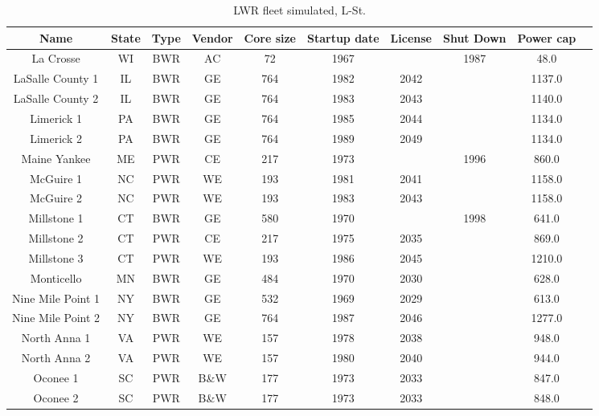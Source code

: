 \begin{table}[H]
    \centering
    \caption{LWR fleet simulated, L-St.}
    \label{tab:lwr_fleet2}
    \begin{tabular}{c c c c c c c c c c}
    \hline
    \textbf{Name} & \textbf{State} & \textbf{Type} & \textbf{Vendor} & \textbf{Core size} & \textbf{Startup date} & \textbf{License} & \textbf{Shut Down} & \textbf{Power cap} \\
    \hline
    La Crosse           & WI & BWR & AC   & 72  & 1967 &      & 1987 & 48.0  \\
    LaSalle County 1    & IL & BWR & GE   & 764 & 1982 & 2042 &      & 1137.0\\
    LaSalle County 2    & IL & BWR & GE   & 764 & 1983 & 2043 &      & 1140.0\\
    Limerick 1          & PA & BWR & GE   & 764 & 1985 & 2044 &      & 1134.0\\
    Limerick 2          & PA & BWR & GE   & 764 & 1989 & 2049 &      & 1134.0\\
    Maine Yankee        & ME & PWR & CE   & 217 & 1973 &      & 1996 & 860.0 \\
    McGuire 1           & NC & PWR & WE   & 193 & 1981 & 2041 &      & 1158.0\\
    McGuire 2           & NC & PWR & WE   & 193 & 1983 & 2043 &      & 1158.0\\
    Millstone 1         & CT & BWR & GE   & 580 & 1970 &      & 1998 & 641.0 \\
    Millstone 2         & CT & PWR & CE   & 217 & 1975 & 2035 &      & 869.0 \\
    Millstone 3         & CT & PWR & WE   & 193 & 1986 & 2045 &      & 1210.0\\
    Monticello          & MN & BWR & GE   & 484 & 1970 & 2030 &      & 628.0 \\
    Nine Mile Point 1   & NY & BWR & GE   & 532 & 1969 & 2029 &      & 613.0 \\
    Nine Mile Point 2   & NY & BWR & GE   & 764 & 1987 & 2046 &      & 1277.0\\
    North Anna 1        & VA & PWR & WE   & 157 & 1978 & 2038 &      & 948.0 \\
    North Anna 2        & VA & PWR & WE   & 157 & 1980 & 2040 &      & 944.0 \\
    Oconee 1            & SC & PWR & B\&W & 177 & 1973 & 2033 &      & 847.0 \\
    Oconee 2            & SC & PWR & B\&W & 177 & 1973 & 2033 &      & 848.0 \\

\end{tabular}
\end{table}

